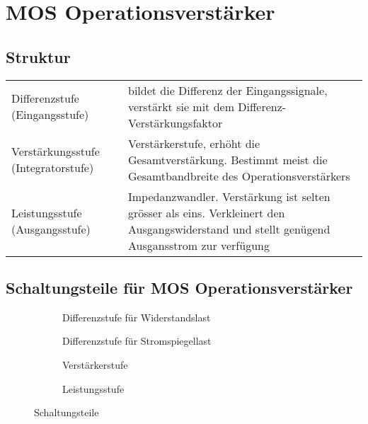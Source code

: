 \section{MOS Operationsverstärker}

\subsection{Struktur}
\begin{tabular}{p{3cm}p{15cm}}
	Differenzstufe (Eingangsstufe) & bildet die Differenz der Eingangssignale,
	verstärkt sie mit dem Differenz-Verstärkungsfaktor\\
	Verstärkungsstufe	(Integratorstufe) & Verstärkerstufe, erhöht die
	Gesamtverstärkung. Bestimmt meist die Gesamtbandbreite des
	Operationsverstärkers\\
	Leistungsstufe (Ausgangsstufe) & Impedanzwandler. Verstärkung ist selten
	grösser als eins. Verkleinert den Ausgangswiderstand und stellt genügend
	Ausgansstrom zur verfügung\\
\end{tabular}

\subsection{Schaltungsteile für MOS Operationsverstärker}
\begin{figure}[h]
	\centering
	\begin{subfigure}[b]{4cm}
		\centering
		{}
		\caption{Differenzstufe für Widerstandslast}
	\end{subfigure}\qquad
	\begin{subfigure}[b]{4cm}
		\centering
		{}
		\caption{Differenzstufe für Stromspiegellast}
	\end{subfigure}
	\qquad
	\begin{subfigure}[b]{4cm}
		\centering
		{}
		\caption{Verstärkerstufe}
	\end{subfigure}
	\qquad
	\begin{subfigure}[b]{4cm}
		\centering
		{}
		\caption{Leistungsstufe}
	\end{subfigure}
	\caption{Schaltungsteile}
	\label{fig:Schaltungsteile}
\end{figure}

